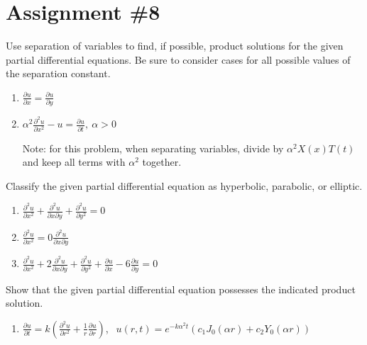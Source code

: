 \chapter{Assignment \#8}
\label{ch:ass8}
\begin{fullwidth}
Use separation of variables to find, if possible, product solutions for the given partial differential equations.  Be sure to consider cases for all possible values of the separation constant.

\begin{enumerate}
\item $\frac{\partial u}{\partial x} = \frac{\partial u}{\partial y}$

\vspace{1.0cm}

\item $\alpha^2 \frac{\partial^2 u}{\partial x^2} - u = \frac{\partial u}{\partial t}, \ \alpha>0$

Note: for this problem, when separating variables, divide by $\alpha^2 X(x)T(t)$ and keep all terms with $\alpha^2$ together.
\end{enumerate}

\vspace{1.0cm}

\noindent Classify the given partial differential equation as hyperbolic, parabolic, or elliptic.
\begin{enumerate}[resume]
\item $\frac{\partial^2 u}{\partial x^2} + \frac{\partial^2 u}{\partial x \partial y} + \frac{\partial^2 u}{\partial y^2} = 0$

\vspace{1.0cm}

\item $\frac{\partial^2 u}{\partial x^2}=0\frac{\partial^2 u}{\partial x \partial y}$

\vspace{1.0cm}

\item $\frac{\partial^2 u}{\partial x^2} + 2 \frac{\partial^2 u}{\partial x \partial y} + \frac{\partial^2 u}{\partial y^2} + \frac{\partial u}{\partial x} - 6 \frac{\partial u}{\partial y} = 0$
\end{enumerate}

\vspace{1.0cm}

\noindent Show that the given partial differential equation possesses the indicated product solution.
\begin{enumerate}[resume]
\item $\frac{\partial u}{\partial t} = k\left(\frac{\partial^2 u}{\partial r^2} + \frac{1}{r} \frac{\partial u}{\partial r} \right)$, $ \ \ u(r,t) = e^{-k \alpha^2 t}\left(c_1 J_0(\alpha r) + c_2 Y_0(\alpha r) \right)$ 


\end{enumerate}
\end{fullwidth}
